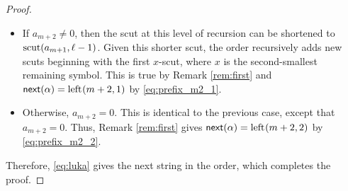 \begin{proof}
\begin{itemize}[nosep]
    \item If $a_{m+2} \neq 0$, then the scut at this level of recursion can be shortened to $\operatorname{scut}(a_{m+1}, \ell-1)$.
    Given this shorter scut, the order recursively adds new scuts beginning with the first $x$-scut, where $x$ is the second-smallest remaining symbol.
    This is true by Remark \ref{rem:first} and $\mathsf{next}{(\alpha)} = \operatorname{left}_{}(m+2,1)$ by \eqref{eq:prefix_m2_1}.
    \item Otherwise, $a_{m+2} = 0$.
    This is identical to the previous case, except that $a_{m+2} = 0$.
    Thus, Remark \ref{rem:first} gives $\mathsf{next}{(\alpha)} = \operatorname{left}_{}(m+2,2)$ by \eqref{eq:prefix_m2_2}.
\end{itemize}
Therefore, \eqref{eq:luka} gives the next string in the order, which completes the proof.
\end{proof}

